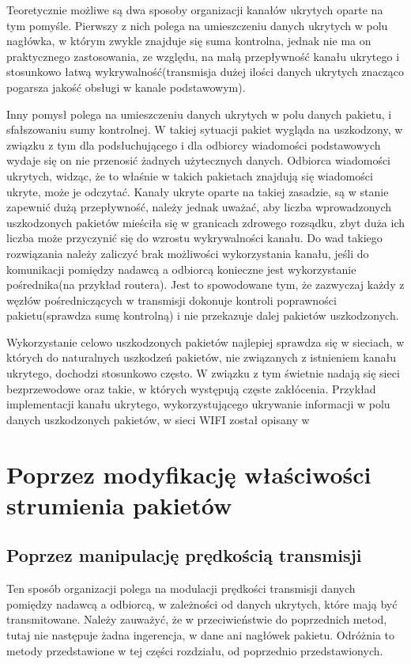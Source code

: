 \documentclass[a4paper, twoside, 12pt]{report}
\begin{document}
        Teoretycznie możliwe są dwa
        sposoby organizacji kanałów ukrytych oparte na tym pomyśle. Pierwszy z nich polega na umieszczeniu
        danych ukrytych w polu nagłówka, w którym zwykle znajduje się suma kontrolna,
        jednak nie ma on praktycznego zastosowania, ze względu, na małą przepływność
        kanału ukrytego i stosunkowo łatwą wykrywalność(transmisja dużej ilości
        danych ukrytych znacząco pogarsza jakość obsługi w kanale podstawowym).

        Inny pomysł polega
        na umieszczeniu danych ukrytych w polu danych pakietu, i sfałszowaniu sumy
        kontrolnej. W takiej sytuacji pakiet wygląda na uszkodzony, w związku z tym
        dla podsłuchującego i dla odbiorcy wiadomości podstawowych wydaje się
        on nie przenosić żadnych użytecznych danych. Odbiorca wiadomości ukrytych,
        widząc, że to właśnie w takich pakietach znajdują się wiadomości ukryte,
        może je odczytać. Kanały ukryte oparte na takiej zasadzie, są w stanie
        zapewnić dużą przepływność, należy jednak uważać, aby liczba wprowadzonych
        uszkodzonych pakietów mieściła się w granicach zdrowego rozsądku, zbyt duża
        ich liczba może przyczynić się do wzrostu wykrywalności kanału. Do wad takiego
        rozwiązania należy zaliczyć brak możliwości wykorzystania kanału, jeśli do
        komunikacji pomiędzy nadawcą a odbiorcą konieczne jest wykorzystanie pośrednika(na przykład routera).
        Jest to spowodowane tym, że zazwyczaj każdy z węzłów pośredniczących w transmisji
        dokonuje kontroli poprawności pakietu(sprawdza sumę kontrolną) i nie przekazuje
        dalej pakietów uszkodzonych.

        Wykorzystanie celowo uszkodzonych pakietów najlepiej sprawdza się w
        sieciach, w których do naturalnych uszkodzeń pakietów, nie związanych z
        istnieniem kanału ukrytego, dochodzi stosunkowo często. W związku z tym
        świetnie nadają się sieci bezprzewodowe oraz takie, w których występują
        częste zakłócenia. Przykład implementacji kanału ukrytego, wykorzystującego
        ukrywanie informacji w polu danych uszkodzonych pakietów, w sieci WIFI
        został opisany w \cite{HICCUPS}

    \section{Poprzez modyfikację właściwości strumienia pakietów} \label{MODYFIKACJASTRUMIENIA}
        \subsection{Poprzez manipulację prędkością transmisji}
        Ten sposób organizacji polega na modulacji prędkości transmisji danych
        pomiędzy nadawcą a odbiorcą, w zależności od danych ukrytych, które mają
        być transmitowane. Należy zauważyć, że w przeciwieństwie do poprzednich
        metod, tutaj nie następuje żadna ingerencja, w dane ani nagłówek pakietu.
        Odróżnia to metody przedstawione w tej części rozdziału, od poprzednio
        przedstawionych.
\end{document}
